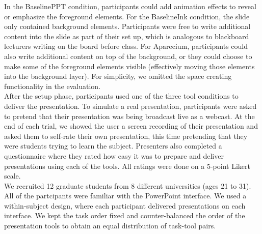 In the BaselinePPT condition, participants could add animation effects to reveal or emphasize the foreground elements. For the BaselineInk condition, the slide only contained background elements. Participants were free to write additional content into the slide as part of their set up, which is analogous to blackboard lecturers writing on the board before class. For Aparecium, participants could also write additional content on top of the background, or they could choose to make some of the foreground elements visible (effectively moving those elements into the background layer). For simplicity, we omitted the space creating functionality in the evaluation. \\

After the setup phase, participants used one of the three tool conditions to deliver the presentation. 
%
To simulate a real presentation, participants were asked to pretend that their presentation was being broadcast live as a webcast. At the end of each trial, we showed the user a screen recording of their presentation and asked them to self-rate their own presentation, this time pretending that they were students trying to learn the subject. Presenters also completed a questionnaire where they rated how easy it was to prepare and deliver presentations using each of the tools. All ratings were done on a 5-point Likert scale.\\

We recruited 12 graduate students from 8 different universities (ages 21 to 31). All of the partcipants were familiar with the PowerPoint interface. We used a within-subject design, where each participant delivered presentations on each interface. We kept the task order fixed and counter-balanced the order of the presentation tools to obtain an equal distribution of task-tool pairs.
%

